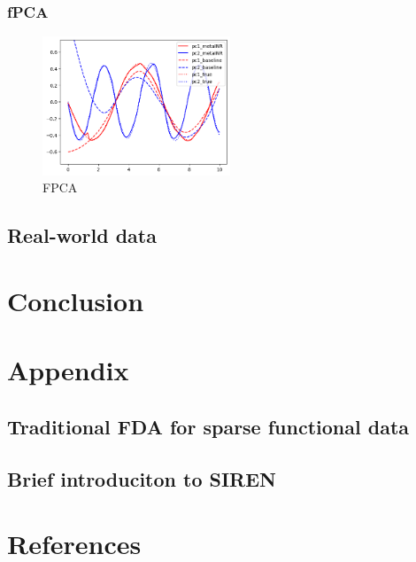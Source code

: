\documentclass{article}
\begin{document}
\subsubsection{fPCA}
\begin{figure}
  \centering
  \includegraphics[width=0.5\textwidth]{fPCA.png}
  \caption{FPCA}
\end{figure}



\subsection{Real-world data}
\section{Conclusion}

\section{Appendix}

\subsection{Traditional FDA for sparse functional data}

\subsection{Brief introduciton to SIREN}

\section*{References}
\end{document}
